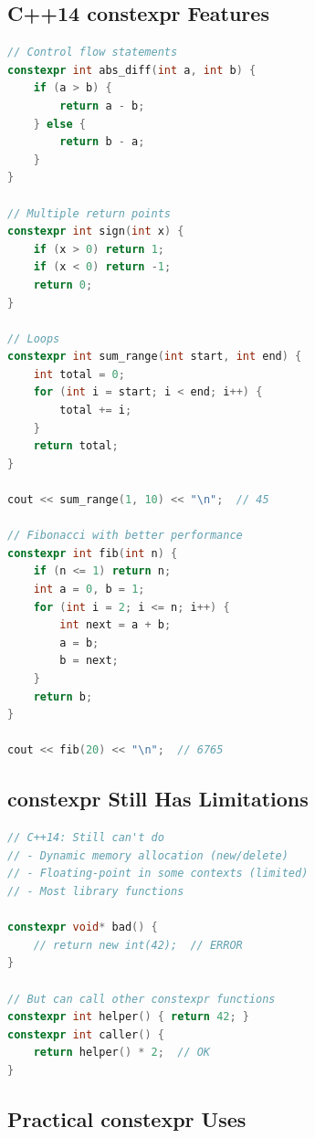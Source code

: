 \hypertarget{c14-constexpr-features}{%
\subsection{C++14 constexpr Features}\label{c14-constexpr-features}}

\begin{lstlisting}[language={C++}]
// Control flow statements
constexpr int abs_diff(int a, int b) {
    if (a > b) {
        return a - b;
    } else {
        return b - a;
    }
}

// Multiple return points
constexpr int sign(int x) {
    if (x > 0) return 1;
    if (x < 0) return -1;
    return 0;
}

// Loops
constexpr int sum_range(int start, int end) {
    int total = 0;
    for (int i = start; i < end; i++) {
        total += i;
    }
    return total;
}

cout << sum_range(1, 10) << "\n";  // 45

// Fibonacci with better performance
constexpr int fib(int n) {
    if (n <= 1) return n;
    int a = 0, b = 1;
    for (int i = 2; i <= n; i++) {
        int next = a + b;
        a = b;
        b = next;
    }
    return b;
}

cout << fib(20) << "\n";  // 6765
\end{lstlisting}

\hypertarget{constexpr-still-has-limitations}{%
\subsection{constexpr Still Has
Limitations}\label{constexpr-still-has-limitations}}

\begin{lstlisting}[language={C++}]
// C++14: Still can't do
// - Dynamic memory allocation (new/delete)
// - Floating-point in some contexts (limited)
// - Most library functions

constexpr void* bad() {
    // return new int(42);  // ERROR
}

// But can call other constexpr functions
constexpr int helper() { return 42; }
constexpr int caller() {
    return helper() * 2;  // OK
}
\end{lstlisting}

\hypertarget{practical-constexpr-uses}{%
\subsection{Practical constexpr Uses}\label{practical-constexpr-uses}}

